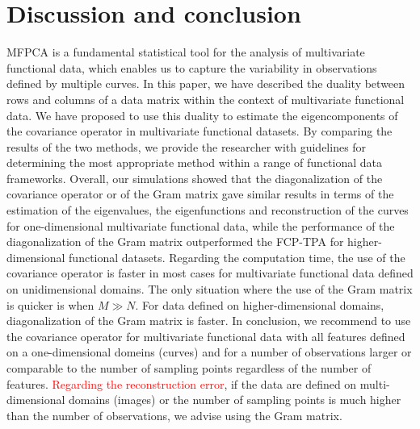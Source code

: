 \section{Discussion and conclusion} %
\label{sec:discussion}

MFPCA is a fundamental statistical tool for the analysis of multivariate functional data, which enables us to capture the variability in observations defined by multiple curves. In this paper, we have described the duality between rows and columns of a data matrix within the context of multivariate functional data. We have proposed to use this duality to estimate the eigencomponents of the covariance operator in multivariate functional datasets. By comparing the results of the two methods, we provide the researcher with guidelines for determining the most appropriate method within a range of functional data frameworks. 
Overall, our simulations showed that the diagonalization of the covariance operator or of the Gram matrix gave similar results in terms of the estimation of the eigenvalues, the eigenfunctions and reconstruction of the curves for one-dimensional multivariate functional data, while the performance of the diagonalization of the Gram matrix outperformed the FCP-TPA for higher-dimensional functional datasets. Regarding the computation time, the use of the covariance operator is faster in most cases for multivariate functional data defined on unidimensional domains. The only situation where the use of the Gram matrix is quicker is when $M \gg N$. For data defined on higher-dimensional domains, diagonalization of the Gram matrix is faster.
In conclusion, we recommend to use the covariance operator for multivariate functional data with all features defined on a one-dimensional domeins (curves) and for a number of observations larger or comparable to the number of sampling points regardless of the number of features. \textcolor{red}{Regarding the reconstruction error}, if the data are defined on multi-dimensional domains (images) or the number of sampling points is much higher than the number of observations, we advise using the Gram matrix.

